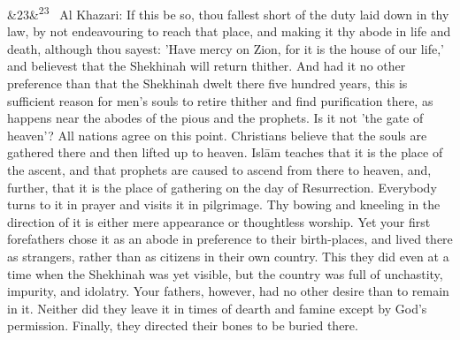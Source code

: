 \documentclass[12pt]{article}
\newcommand{\para}[1][]{\par\noindent\ifx&#1&\else\textsuperscript{\footnotesize #1}~\fi}
\begin{document}
\para[23] Al Khazari: If this be so, thou fallest short of the duty laid down in thy law, by not endeavouring to reach that place, and making it thy abode in life and death, although thou sayest: 'Have mercy on Zion, for it is the house of our life,' and believest that the Shekhinah will return thither. And had it no other preference than that the Shekhinah dwelt there five hundred years, this is sufficient reason for men's souls to retire thither and find purification there, as happens near the abodes of the pious and the prophets. Is it not 'the gate of heaven'? All nations agree on this point. Christians believe that the souls are gathered there and then lifted up to heaven. Islām teaches that it is the place of the ascent, and that prophets are caused to ascend from there to heaven, and, further, that it is the place of gathering on the day of Resurrection. Everybody turns to it in prayer and visits it in pilgrimage. Thy bowing and kneeling in the direction of it is either mere appearance or thoughtless worship. Yet your first forefathers chose it as an abode in preference to their birth-places, and lived there as strangers, rather than as citizens in their own country. This they did even at a time when the Shekhinah was yet visible, but the country was full of unchastity, impurity, and idolatry. Your fathers, however, had no other desire than to remain in it. Neither did they leave it in times of dearth and famine except by God's permission. Finally, they directed their bones to be buried there.
\end{document}

